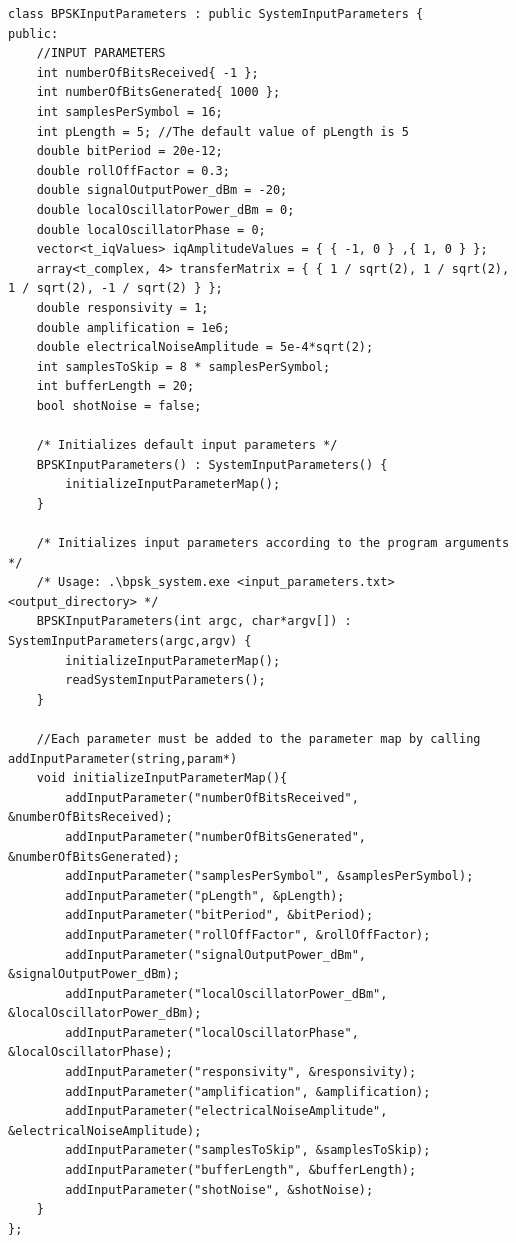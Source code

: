 \begin{lstlisting}
class BPSKInputParameters : public SystemInputParameters {
public:
	//INPUT PARAMETERS
	int numberOfBitsReceived{ -1 };
	int numberOfBitsGenerated{ 1000 };
	int samplesPerSymbol = 16;
	int pLength = 5; //The default value of pLength is 5
	double bitPeriod = 20e-12;
	double rollOffFactor = 0.3;
	double signalOutputPower_dBm = -20;
	double localOscillatorPower_dBm = 0;
	double localOscillatorPhase = 0;
	vector<t_iqValues> iqAmplitudeValues = { { -1, 0 } ,{ 1, 0 } };
	array<t_complex, 4> transferMatrix = { { 1 / sqrt(2), 1 / sqrt(2), 1 / sqrt(2), -1 / sqrt(2) } };
	double responsivity = 1;
	double amplification = 1e6;
	double electricalNoiseAmplitude = 5e-4*sqrt(2);
	int samplesToSkip = 8 * samplesPerSymbol;
	int bufferLength = 20;
	bool shotNoise = false;

	/* Initializes default input parameters */
	BPSKInputParameters() : SystemInputParameters() {
		initializeInputParameterMap();
	}

	/* Initializes input parameters according to the program arguments */
    /* Usage: .\bpsk_system.exe <input_parameters.txt> <output_directory> */
	BPSKInputParameters(int argc, char*argv[]) : SystemInputParameters(argc,argv) {
		initializeInputParameterMap();
		readSystemInputParameters();
	}

	//Each parameter must be added to the parameter map by calling addInputParameter(string,param*)
	void initializeInputParameterMap(){
		addInputParameter("numberOfBitsReceived", &numberOfBitsReceived);
		addInputParameter("numberOfBitsGenerated", &numberOfBitsGenerated);
		addInputParameter("samplesPerSymbol", &samplesPerSymbol);
		addInputParameter("pLength", &pLength);
		addInputParameter("bitPeriod", &bitPeriod);
		addInputParameter("rollOffFactor", &rollOffFactor);
		addInputParameter("signalOutputPower_dBm", &signalOutputPower_dBm);
		addInputParameter("localOscillatorPower_dBm", &localOscillatorPower_dBm);
		addInputParameter("localOscillatorPhase", &localOscillatorPhase);
		addInputParameter("responsivity", &responsivity);
		addInputParameter("amplification", &amplification);
		addInputParameter("electricalNoiseAmplitude", &electricalNoiseAmplitude);
		addInputParameter("samplesToSkip", &samplesToSkip);
		addInputParameter("bufferLength", &bufferLength);
		addInputParameter("shotNoise", &shotNoise);
	}
};
\end{lstlisting}

